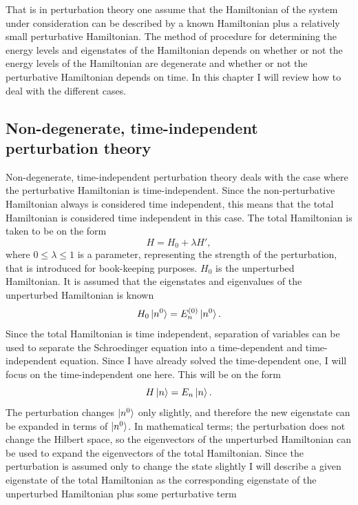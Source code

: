 That is in perturbation theory one assume that the Hamiltonian of the system under consideration can be described by a known Hamiltonian plus a relatively small perturbative Hamiltonian. The method of procedure for determining the energy levels and eigenstates of the Hamiltonian depends on whether or not the energy levels of the Hamiltonian are degenerate and whether or not the perturbative Hamiltonian depends on time. In this chapter I will review how to deal with the different cases.

\subsection*{Non-degenerate, time-independent perturbation theory}
Non-degenerate, time-independent perturbation theory deals with the case where the perturbative Hamiltonian is time-independent. Since the non-perturbative Hamiltonian always is considered time independent, this means that the total Hamiltonian is considered time independent in this case. The total Hamiltonian is taken to be on the form
\begin{equation}
	H=H_0+\lambda H',
	\label{ham13}
\end{equation} 
where $0\leq\lambda\leq1$ is a parameter, representing the strength of the perturbation, that is introduced for book-keeping purposes.  $H_0$ is the unperturbed Hamiltonian. It is assumed that the eigenstates and eigenvalues of the unperturbed Hamiltonian is known
\begin{equation}
	H_0\ket{n^0}=E_n^{(0)}\ket{n^0}.
\end{equation} 
Since the total Hamiltonian is time independent, separation of variables can be used to separate the Schroedinger equation into a time-dependent and time-independent equation. Since I have already solved the time-dependent one, I will focus on the time-independent one here. This will be on the form
\begin{equation}
	H\ket{n}=E_n\ket{n}.
	\label{ham12}
\end{equation} 
The perturbation changes $\ket{n^0}$ only slightly, and therefore the new eigenstate can be expanded in terms of $\ket{n^0}$. In mathematical terms; the perturbation does not change the Hilbert space, so the eigenvectors of the unperturbed Hamiltonian can be used to expand the eigenvectors of the total Hamiltonian. Since the perturbation is assumed only to change the state slightly I will describe a given eigenstate of the total Hamiltonian as the corresponding eigenstate of the unperturbed Hamiltonian plus some perturbative term
